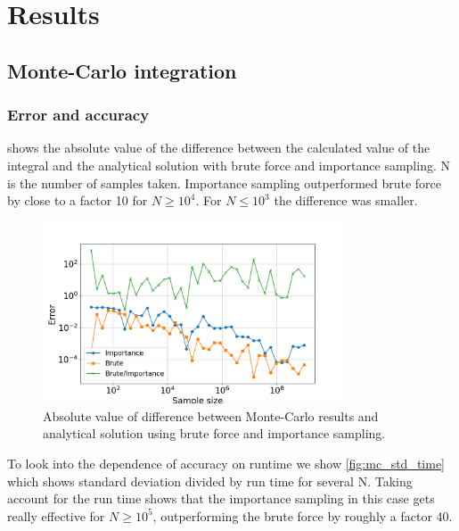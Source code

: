 \section{Results}

\subsection{Monte-Carlo integration}

\subsubsection{Error and accuracy}

 shows the absolute value of the difference between the
calculated value of the integral and the analytical solution with brute force
and importance sampling. N is the number of samples taken.
Importance sampling outperformed brute force by close to a factor 10 for $N \geq 10^4$.
For $N \leq 10^3$ the difference was smaller.

\begin{figure}[H]
  \centering
  \includegraphics[width=0.8\textwidth]{../figures/mc_error.png}
  \caption{Absolute value of difference between Monte-Carlo results and analytical
  solution using brute force and importance sampling.}

  \label{fig:mc_error}
\end{figure}

To look into the dependence of accuracy on runtime we show \cref{fig:mc_std_time}
which shows standard deviation divided by run time for several N. Taking account
for the run time shows that the importance sampling in this case gets really
effective for $N \geq 10^5$, outperforming the brute force by roughly a factor
40.

